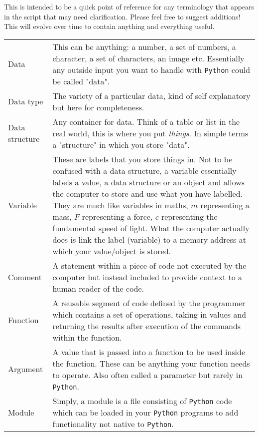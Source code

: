 This is intended to be a quick point of reference for any terminology that appears in the script that may need clarification. Please feel free to suggest additions! This will evolve over time to contain anything and everything useful.

\begingroup
\setlength{\tabcolsep}{10pt} %
\renewcommand{\arraystretch}{1.5} %
\begin{longtable}{l p{12cm}}
Data & This can be anything: a number, a set of numbers, a character, a set of characters, an image etc. Essentially any outside input you want to handle with \texttt{Python} could be called "data". \\
Data type & The variety of a particular data, kind of self explanatory but here for completeness. \\
Data structure & Any container for data. Think of a table or list in the real world, this is where you put \textit{things}. In simple terms a "structure" in which you store "data". \\
Variable & These are labels that you store things in. Not to be confused with a data structure, a variable essentially labels a value, a data structure or an object and allows the computer to store and use what you have labelled. They are much like variables in maths, $m$ representing a mass, $F$ representing a force, $c$ representing the fundamental speed of light. What the computer actually does is link the label (variable) to a memory address at which your value/object is stored. \\
Comment & A statement within a piece of code not executed by the computer but instead included to provide context to a human reader of the code. \\
Function & A reusable segment of code defined by the programmer which contains a set of operations, taking in values and returning the results after execution of the commands within the function. \\
Argument & A value that is passed into a function to be used inside the function. These can be anything your function needs to operate. Also often called a parameter but rarely in \texttt{Python}. \\
Module & Simply, a module is a file consisting of \texttt{Python} code which can be loaded in your \texttt{Python} programs to add functionality not native to \texttt{Python}. \\

\end{longtable}
